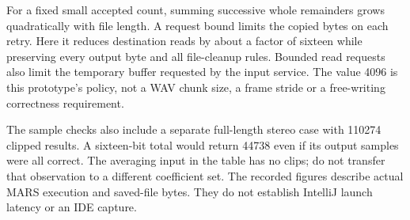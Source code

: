 For a fixed small accepted count, summing successive whole remainders grows
quadratically with file length. A request bound limits the copied bytes on each retry.
Here it reduces destination reads by about a factor of sixteen while preserving every
output byte and all file-cleanup rules. Bounded read requests also limit the temporary
buffer requested by the input service. The value 4096 is this prototype's policy, not
a WAV chunk size, a frame stride or a free-writing correctness requirement.

The sample checks also include a separate full-length stereo case with 110274 clipped
results. A sixteen-bit total would return 44738 even if its output samples were all
correct. The averaging input in the table has no clips; do not transfer that observation
to a different coefficient set. The recorded figures describe actual MARS execution
and saved-file bytes. They do not establish IntelliJ launch latency or an IDE capture.
